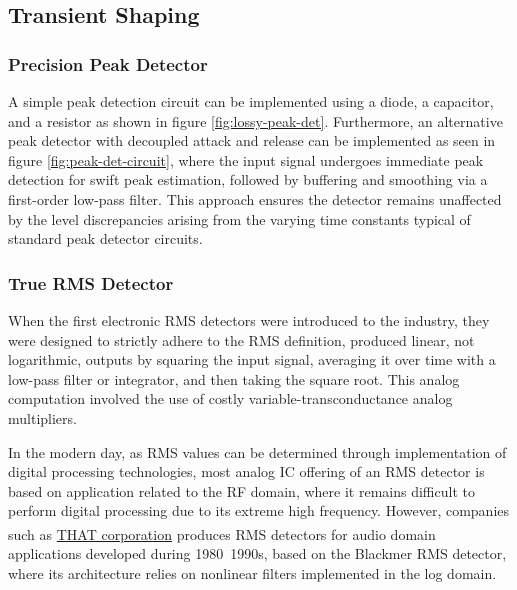 \documentclass[10pt]{article}
\begin{document}
\begin{multicols*}{2}
\begin{minipage}{\linewidth}
                            \label{plot:tanh}
                        
                        \end{minipage}
            
            \subsection{Transient Shaping}

                \subsubsection{Precision Peak Detector}
                    A simple peak detection circuit can be implemented using a diode, a capacitor, and a resistor as shown in figure \ref{fig:lossy-peak-det}. Furthermore, an alternative peak detector with decoupled attack and release can be implemented as seen in figure \ref{fig:peak-det-circuit}, where the input signal undergoes immediate peak detection for swift peak estimation, followed by buffering and smoothing via a first-order low-pass filter. This approach ensures the detector remains unaffected by the level discrepancies arising from the varying time constants typical of standard peak detector circuits.

                \subsubsection{True RMS Detector}
                    When the first electronic RMS detectors were introduced to the industry, they were designed to strictly adhere to the RMS definition, produced linear, not logarithmic, outputs by squaring the input signal, averaging it over time with a low-pass filter or integrator, and then taking the square root. This analog computation involved the use of costly variable-transconductance analog multipliers. \cite{rms-history}\par
                    In the modern day, as RMS values can be determined through implementation of digital processing technologies, most analog IC offering of an RMS detector is based on application related to the RF domain, where it remains difficult to perform digital processing due to its extreme high frequency. However, companies such as \href{https://www.thatcorp.com/}{THAT corporation\textsuperscript{\texttrademark}} produces RMS detectors for audio domain applications developed during 1980~1990s, based on the Blackmer RMS detector, where its architecture relies on nonlinear filters implemented in the log domain.


\end{multicols*}
\end{document}
